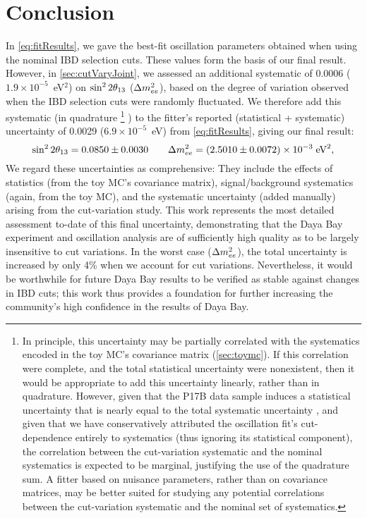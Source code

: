 \documentclass[../thesis.tex]{subfiles}
\begin{document}
\chapter{Conclusion}
\label{chap:conclusion}

In \autoref{eq:fitResults}, we gave the best-fit oscillation parameters obtained when using the nominal IBD selection cuts. These values form the basis of our final result. However, in \autoref{sec:cutVaryJoint}, we assessed an additional systematic of 0.0006 ($1.9\times10^{-5}$~eV$^2$) on $\sin^2 2\theta_{13}$ ($\Delta m^2_{ee}$), based on the degree of variation observed when the IBD selection cuts were randomly fluctuated. We therefore add this systematic (in quadrature%
\footnote{In principle, this uncertainty may be partially correlated with the systematics encoded in the toy MC's covariance matrix (\autoref{sec:toymc}). If this correlation were complete, and the total statistical uncertainty were nonexistent, then it would be appropriate to add this uncertainty linearly, rather than in quadrature. However, given that the P17B data sample induces a statistical uncertainty that is nearly equal to the total systematic uncertainty \cite{p17b_osc}, and given that we have conservatively attributed the oscillation fit's cut-dependence entirely to systematics (thus ignoring its statistical component), the correlation between the cut-variation systematic and the nominal systematics is expected to be marginal, justifying the use of the quadrature sum. A fitter based on nuisance parameters, rather than on covariance matrices, may be better suited for studying any potential correlations between the cut-variation systematic and the nominal set of systematics.}%
) to the fitter's reported (statistical + systematic) uncertainty of 0.0029 ($6.9\times10^{-5}$~eV) from \autoref{eq:fitResults}, giving our final result:
\begin{equation}
  \sin^2 2\theta_{13} = 0.0850 \pm 0.0030 \qquad \Delta m^2_{ee} = (2.5010 \pm 0.0072)\times10^{-3}\;\text{eV}^2,
\end{equation}
We regard these uncertainties as comprehensive: They include the effects of statistics (from the toy MC's covariance matrix), signal/background systematics (again, from the toy MC), and the systematic uncertainty (added manually) arising from the cut-variation study. This work represents the most detailed assessment to-date of this final uncertainty, demonstrating that the Daya Bay experiment and oscillation analysis are of sufficiently high quality as to be largely insensitive to cut variations. In the worst case ($\Delta m^2_{ee}$), the total uncertainty is increased by only 4\% when we account for cut variations. Nevertheless, it would be worthwhile for future Daya Bay results to be verified as stable against changes in IBD cuts; this work thus provides a foundation for further increasing the community's high confidence in the results of Daya Bay.
\end{document}
